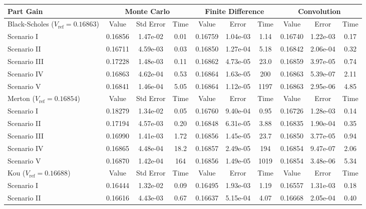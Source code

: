 \begin{table}
\centering
  \begin{tabular}{l||c|c|c||c|c|c||c|c|c}
    \toprule
    \textbf{Part Gain} & \multicolumn{3}{c||}{\textbf{Monte Carlo}} & \multicolumn{3}{c||}{\textbf{Finite Difference}} & \multicolumn{3}{c}{\textbf{Convolution}} \\
    \toprule
    Black-Scholes ($V_\text{ref}= 0.16863$) & Value & Std Error  & Time & Value & Error & Time & Value & Error & Time \\
      \midrule
    Scenario I   & 0.16856 & 1.47e-02 & 0.01 & 0.16759 & 1.04e-03 & 1.14 & 0.16740 & 1.22e-03 & 0.17\\
    Scenario II  & 0.16711 & 4.59e-03 & 0.03 & 0.16850 & 1.27e-04 & 5.18 & 0.16842 & 2.06e-04 & 0.32\\
    Scenario III & 0.17228 & 1.48e-03 & 0.11 & 0.16862 & 4.73e-05 & 23.0 & 0.16859 & 3.97e-05 & 0.74\\
    Scenario IV  & 0.16863 & 4.62e-04 & 0.53 & 0.16864 & 1.63e-05 & 200  & 0.16863 & 5.39e-07 & 2.11\\
    Scenario V   & 0.16841 & 1.46e-04 & 5.05 & 0.16864 & 1.12e-05 & 1197 & 0.16863 & 2.95e-06 & 4.85\\
     \midrule
      Merton ($V_\text{ref}=0.16854$) & Value & Std Error  & Time & Value & Error & Time & Value & Error & Time \\
      \midrule
    Scenario I   & 0.18279 & 1.34e-02 & 0.05 & 0.16760 & 9.40e-04 & 0.95 & 0.16726 & 1.28e-03 & 0.14 \\
    Scenario II  & 0.17194 & 4.57e-03 & 0.20 & 0.16848 & 6.31e-05 & 3.88 & 0.16835 & 1.90e-04 & 0.35 \\
    Scenario III & 0.16990 & 1.41e-03 & 1.72 & 0.16856 & 1.45e-05 & 23.7 & 0.16850 & 3.77e-05 & 0.94 \\
    Scenario IV  & 0.16865 & 4.48e-04 & 18.2 & 0.16857 & 2.49e-05 & 194  & 0.16854 & 9.47e-07 & 2.06 \\
    Scenario V   & 0.16870 & 1.42e-04 & 164  & 0.16856 & 1.49e-05 & 1019 & 0.16854 & 3.48e-06 & 5.34 \\
     \midrule
      Kou ($V_\text{ref}=0.16688$) & Value & Std Error  & Time & Value & Error & Time & Value & Error & Time \\
      \midrule
    Scenario I   & 0.16444 & 1.32e-02 & 0.09 & 0.16495 & 1.93e-03 & 1.19 & 0.16557 & 1.31e-03 & 0.18 \\
    Scenario II  & 0.16616 & 4.43e-03 & 0.67 & 0.16637 & 5.15e-04 & 4.07 & 0.16668 & 2.05e-04 & 0.40 \\

\end{tabular}
\end{table}
